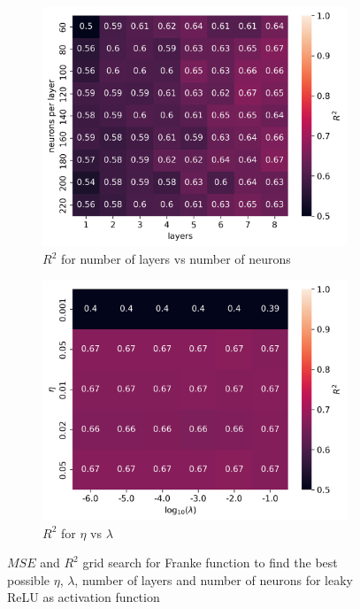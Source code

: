\documentclass[11pt]{article}
\begin{document}
\begin{figure}[H]
    \begin{subfigure}{.5\textwidth}
        \centering
        \includegraphics[width=\textwidth]{../figures/franke_L_n_test_lrelu_R2.png}
        \caption{$R^2$ for number of layers vs number of neurons}
        \label{fig:}
    \end{subfigure}
    \begin{subfigure}{.5\textwidth}
        \centering
        \includegraphics[width=\textwidth]{../figures/franke_eta_lmb_lrelu_R2.png}
        \caption{$R^2$ for $\eta$ vs $\lambda$}
        \label{fig:}
    \end{subfigure}
    \caption{$MSE$ and $R^2$ grid search for Franke function to find the best possible $\eta$, $\lambda$, number of layers and number of neurons for leaky ReLU as activation function}
    \label{fig:franke_grid_3}
\end{figure}
\end{document}
